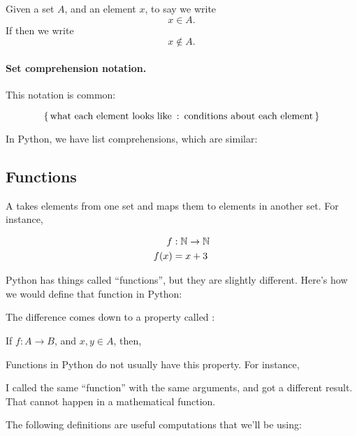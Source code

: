 Given a set $A$, and an element $x$, to say  we write $$x \in A.$$ If  then we write $$x \notin A.$$

\paragraph{Set comprehension notation.}

This notation is common:

\begin{equation*}
  \left\{\, \text{what each element looks like} \::\: \text{conditions about
      each element} \,\right\}
\end{equation*}

In Python, we have list comprehensions, which are similar:


\subsection{Functions}

A  takes elements from one set and maps
them to elements in another set. For instance,

\begin{align*}
  f & : \mathbb{N} \to \mathbb{N} \\
  f(x) & = x + 3
\end{align*}

Python has things called ``functions'', but they are slightly
different. Here's how we would define that function in Python:


The difference comes down to a property called :

\begin{axiom}
  \label{foo}
  If $f : A \to B$, and $x, y \in A$, then, 
\end{axiom}

Functions in Python do not usually have this property. For instance,


I called the same ``function'' with the same arguments, and got a
different result. That cannot happen in a mathematical function.

The following definitions are useful computations that we'll be using:

